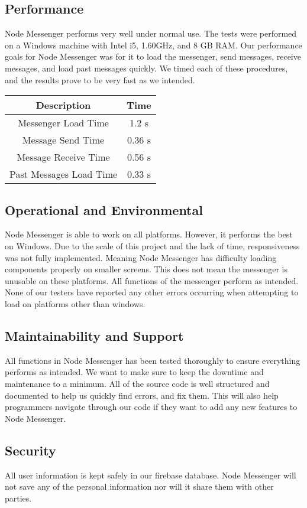\documentclass[12pt, titlepage]{article}
\begin{document}
	\subsection{Performance}
	Node Messenger performs very well under normal use. The tests were performed on a Windows machine with Intel i5, 1.60GHz, and  8 GB RAM. Our performance goals for Node Messenger was for it to load the messenger, send messages, receive messages, and load past messages quickly. We timed each of these procedures, and the results prove to be very fast as we intended. 
	\begin{center}
	\begin{tabular}{c c}
	\hline 
	\textbf{Description} & \textbf{Time} \\ 
	\hline 
	Messenger Load Time & 1.2 s \\ 
	Message Send Time & 0.36 s \\ 
	Message Receive Time & 0.56 s \\ 
	Past Messages Load Time & 0.33 s \\ 
	\hline 
	\end{tabular} 
	\end{center}
	\subsection{Operational and Environmental}
	Node Messenger is able to work on all platforms. However, it performs the best on Windows. Due to the scale of this project and the lack of time, responsiveness was not fully implemented. Meaning Node Messenger has difficulty loading components properly on smaller screens. This does not mean the messenger is unusable on these platforms. All functions of the messenger perform as intended. None of our testers have reported any other errors occurring when attempting to load on platforms other than windows. 
	\subsection{Maintainability and Support}
	All functions in Node Messenger has been tested thoroughly to ensure everything performs as intended. We want to make sure to keep the downtime and maintenance to a minimum. All of the source code is well structured and documented to help us quickly find errors, and fix them. This will also help programmers navigate through our code if they want to add any new features to Node Messenger. 
	\subsection{Security}
	All user information is kept safely in our firebase database. Node Messenger will not save any of the personal information nor will it share them with other parties.
\end{document}
